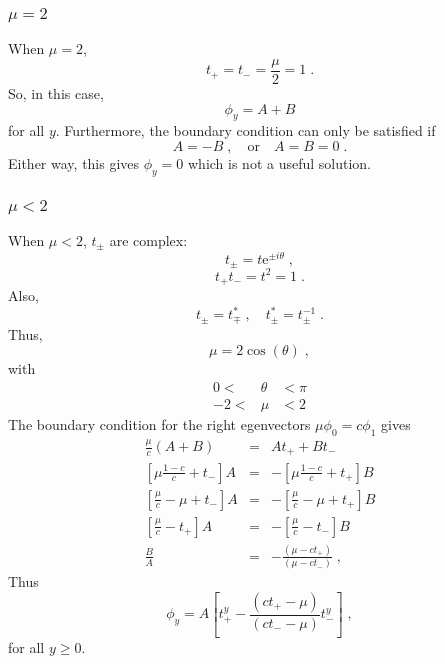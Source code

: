 \documentclass[a4paper,10pt]{article}
\begin{document}
\subsubsection{$\mu =2$}
When $\mu = 2$,
\begin{equation}
  t_+ = t_- = \frac{\mu}{2} = 1 \;.
\end{equation}
So, in this case, 
\begin{equation}
  \phi_y = A + B
\end{equation}
for all $y$. Furthermore, the boundary condition can only be satisfied if
\begin{equation}
  A = -B \;, \quad \mbox{or} \quad A = B = 0 \;.
\end{equation}
Either way, this gives $\phi_y=0$ which is not a useful solution.



\subsubsection{$\mu < 2$}
When $\mu < 2$, $t_\pm$ are complex:
\begin{equation}
  t_\pm = t\mathrm{e}^{\pm i\theta} \;,
\end{equation}
\begin{equation}
  t_+t_- = t^2 = 1 \;.
\end{equation}
Also,
\begin{equation}
  t_\pm = t_\mp^* \;, \quad t_\pm^* = t_\pm^{-1} \;.
\end{equation}
Thus, 
\begin{equation}
  \mu = 2\cos(\theta)\;,
\end{equation}
with
\begin{eqnarray}
  0 < & \theta & < \pi \nonumber \\
  -2 < & \mu & < 2 
\end{eqnarray}
The boundary condition for the right egenvectors $\mu\phi_0=c\phi_1$ gives
\begin{eqnarray}
  \frac{\mu}{c}(A+B) & =&  A t_+ + Bt_- \nonumber \\
  \left[ \mu \frac{1-c}{c} + t_- \right] A & = & -\left[ \mu\frac{1-c}{c} + t_+ \right] B \nonumber \\
  \left[ \frac{\mu}{c} - \mu + t_- \right] A & = & -\left[ \frac{\mu}{c} - \mu + t_+ \right] B \nonumber \\
  \left[ \frac{\mu}{c} - t_+ \right] A & = & -\left[ \frac{\mu}{c} - t_- \right] B \nonumber \\
  \frac{B}{A} & = & -\frac{(\mu - ct_+)}{ (\mu - ct_-)}  \;,
\end{eqnarray}
Thus
\begin{equation}
  \phi_y = A \left[ t_+^y - \frac{(ct_+ - \mu)}{ (ct_- - \mu)} t_-^y \right] \;,
\end{equation}
for all $y\ge0$.
\end{document}
